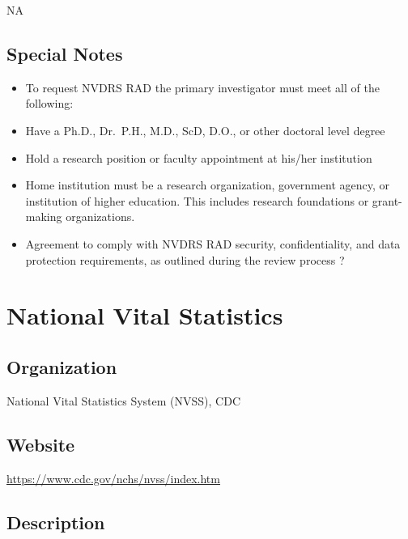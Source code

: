 \documentclass[
]{book}
\providecommand{\tightlist}{%
  \setlength{\itemsep}{0pt}\setlength{\parskip}{0pt}}
\begin{document}
NA

\hypertarget{special-notes-66}{%
\section{Special Notes}\label{special-notes-66}}

\begin{itemize}
\tightlist
\item
  To request NVDRS RAD the primary investigator must meet all of the following:
\item
  Have a Ph.D., Dr.~P.H., M.D., ScD, D.O., or other doctoral level degree
\item
  Hold a research position or faculty appointment at his/her institution
\item
  Home institution must be a research organization, government agency, or institution of higher education. This includes research foundations or grant-making organizations.
\item
  Agreement to comply with NVDRS RAD security, confidentiality, and data protection requirements, as outlined during the review process ?
\end{itemize}

\mainmatter

\hypertarget{national-vital-statistics}{%
\chapter{National Vital Statistics}\label{national-vital-statistics}}

\hypertarget{organization-67}{%
\section{Organization}\label{organization-67}}

National Vital Statistics System (NVSS), CDC

\hypertarget{website-67}{%
\section{Website}\label{website-67}}

\url{https://www.cdc.gov/nchs/nvss/index.htm}

\hypertarget{description-67}{%
\section{Description}\label{description-67}}
\end{document}
